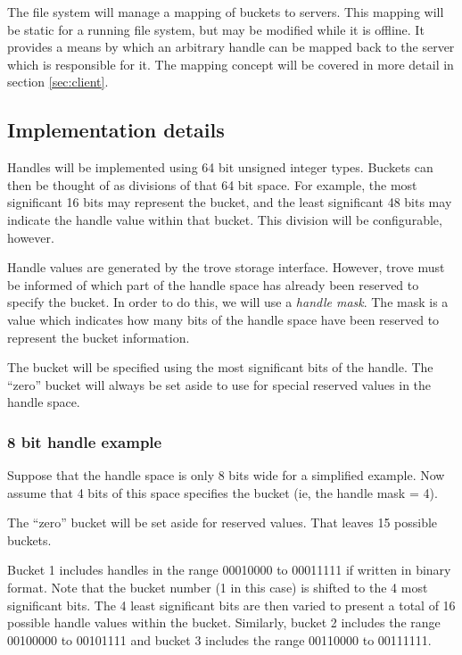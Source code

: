 \documentclass[12pt]{article} %
\begin{document}
The file system will manage a mapping of buckets to servers.  This mapping
will be static for a running file system, but may be modified while it
is offline.  It provides a means by which an arbitrary handle
can be mapped back to the server which is responsible for it.  The mapping
concept will be covered in more detail in section \ref{sec:client}.

\subsection{Implementation details}

Handles will be implemented using 64 bit unsigned integer types.
Buckets can then be thought of as divisions of that 64 bit space.  For
example, the most significant 16 bits may represent the bucket, and the
least significant 48 bits may indicate the handle value within that
bucket.  This division will be configurable, however.

Handle values are generated by the trove storage interface.  However,
trove must be informed of which part of the handle space has already
been reserved to specify the bucket.  In order to do this, we will use
a \emph{handle mask}.  The mask is a value which indicates how many bits
of the handle space have been reserved to represent the bucket
information.  

The bucket will be specified using the most significant bits of the
handle.  The ``zero'' bucket will always be set aside to use for
special reserved values in the handle space.

\subsubsection{8 bit handle example}
\label{sec:example}

Suppose that the handle space is only 8 bits wide for a simplified
example.  Now assume that 4 bits of this space specifies the
bucket (ie, the handle mask = 4).

The ``zero'' bucket will be set aside for reserved values.  That leaves
15 possible buckets.

Bucket 1 includes handles in the range 00010000 to 00011111 if written
in binary format.  Note that the bucket number (1 in this case) is
shifted to the 4 most significant bits.  The 4 least significant bits
are then varied to present a total of 16 possible handle values within
the bucket.  Similarly, bucket 2 includes the range 00100000 to 00101111
and bucket 3 includes the range 00110000 to 00111111.
\end{document}
